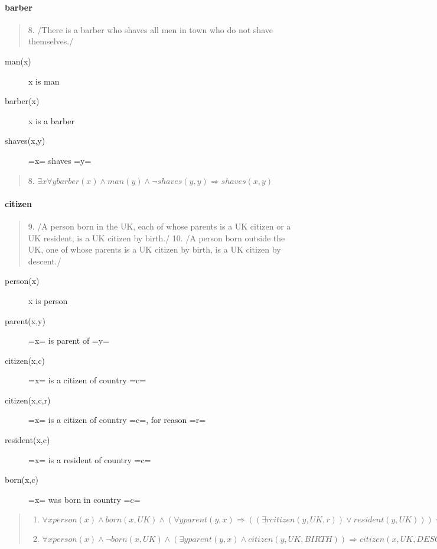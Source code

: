 \paragraph{barber}
\begin{quote}
  8. /There is a barber who shaves all men in town who do not shave themselves./
\end{quote}
\begin{description}
\item [man(x)] x is man
\item [barber(x)] x is a barber
\item [shaves(x,y)] =x= shaves =y=
\end{description}
\begin{quote}
  8. $\exists x \forall y barber(x) \wedge man(y) \wedge \neg shaves(y,y) \Rightarrow shaves(x,y)$
\end{quote}


\paragraph{citizen}
\begin{quote}
    9. /A person born in the UK, each of whose parents is a UK citizen or a UK resident, is a UK citizen by birth./
    10. /A person born outside the UK, one of whose parents is a UK citizen by birth, is a UK citizen by descent./
\end{quote}
\begin{description}
\item [person(x)] x is person
\item [parent(x,y)] =x= is parent of =y=
\item [citizen(x,c)] =x= is a citizen of country =c=
\item [citizen(x,c,r)] =x= is a citizen of country =c=, for reason =r=
\item [resident(x,c)] =x= is a resident of country =c=
\item [born(x,c)] =x= was born in country =c=
\end{description}

\begin{quote}
  \begin{enumerate}
  \item
    $\forall x person(x) \wedge born(x,UK) \wedge (\forall y
    parent(y,x) \Rightarrow ((\exists r citizen(y,UK,r)) \vee
    resident(y,UK))) \Rightarrow citizen(x,UK,BIRTH)$
  \item
    $\forall x person(x) \wedge \neg born(x,UK) \wedge (\exists y
    parent(y,x) \wedge citizen(y,UK,BIRTH)) \Rightarrow
    citizen(x,UK,DESCENT)$
  \end{enumerate}
\end{quote}

